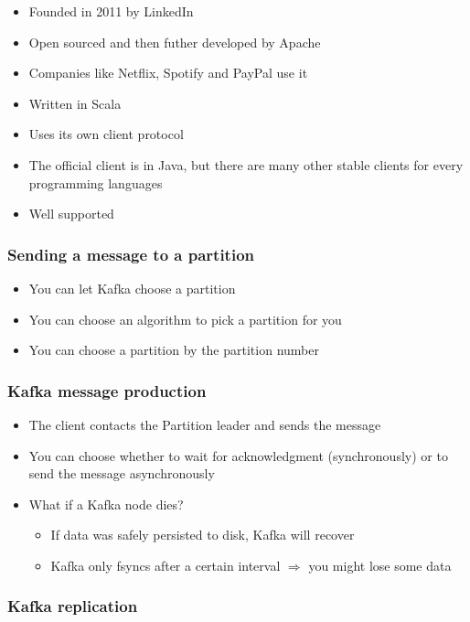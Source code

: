 \documentclass{article}
\begin{document}
\begin{itemize}
    \item Founded in 2011 by LinkedIn
    \item Open sourced and then futher developed by Apache
    \item Companies like Netflix, Spotify and PayPal use it
    \item Written in Scala
    \item Uses its own client protocol
    \item The official client is in Java, but there are many other stable clients for every programming languages
    \item Well supported
\end{itemize}

\subsubsection{Sending a message to a partition}

\begin{itemize}
    \item You can let Kafka choose a partition
    \item You can choose an algorithm to pick a partition for you
    \item You can choose a partition by the partition number
\end{itemize}

\subsubsection{Kafka message production}

\begin{itemize}
    \item The client contacts the Partition leader and sends the message
    \item You can choose whether to wait for acknowledgment (synchronously) or to send the message asynchronously
    \item What if a Kafka node dies?
    \begin{itemize}
        \item If data was safely persisted to disk, Kafka will recover
        \item Kafka only fsyncs after a certain interval $\Rightarrow$ you might lose some data
    \end{itemize}
\end{itemize}

\subsubsection{Kafka replication}
\end{document}
